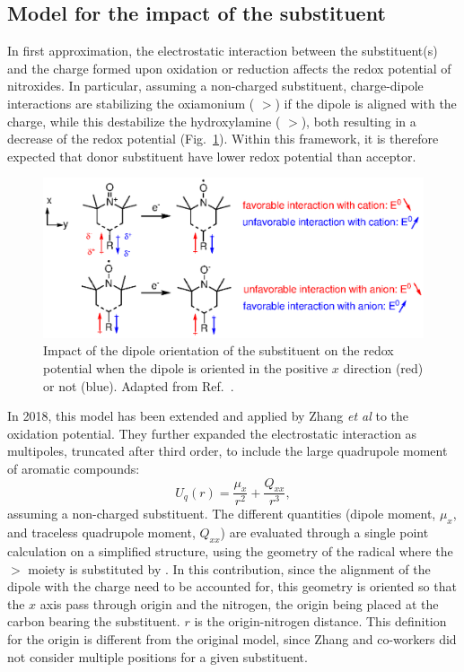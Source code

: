 \documentclass[review]{elsarticle}
\begin{document}
\subsection{Model for the impact of the substituent}

In first approximation, the electrostatic interaction between the substituent(s) and the charge formed upon oxidation or reduction affects the redox potential of nitroxides. In particular, assuming a non-charged substituent, charge-dipole interactions are stabilizing the oxiamonium ( $>$) if the dipole is aligned with the charge, while this destabilize the hydroxylamine ( $>$), both resulting in a decrease of the redox potential (Fig.~\ref{fig:dipole}). Within this framework, it is therefore expected that donor substituent have lower redox potential than acceptor.

\begin{figure}[!h]
	\centering
	\includegraphics[width=.7\linewidth]{Figure2}
	\caption{Impact of the dipole orientation of the substituent on the redox potential when the dipole is oriented in  the positive $x$ direction (red) or not (blue). Adapted from Ref.~.}
	\label{fig:dipole}
\end{figure}

In 2018, this model has been extended and applied by Zhang \textit{et al} \cite{zhangEffectHeteroatomFunctionality2018} to the oxidation potential. They further expanded the electrostatic interaction as  multipoles, truncated after third order, to include the large quadrupole moment of aromatic compounds:\begin{equation}
	U_q(r) = \frac{\mu_x}{r^2} + \frac{Q_{xx}}{r^3}, \label{eq:Er}
\end{equation}
assuming a non-charged substituent. The different quantities (dipole moment, $\mu_x$, and traceless quadrupole moment, $Q_{xx}$) are evaluated through a single point calculation on a simplified structure, using the geometry of the radical where the $>$ moiety is substituted by .  In this contribution, since the alignment of the dipole with the charge need to be accounted for, this geometry is oriented so that the $x$ axis pass through origin and the nitrogen, the origin being placed at the carbon bearing the substituent. $r$ is the origin-nitrogen distance. This definition for the origin is different from the original model, since  Zhang and co-workers did not consider multiple positions for a given substituent. 
\end{document}
